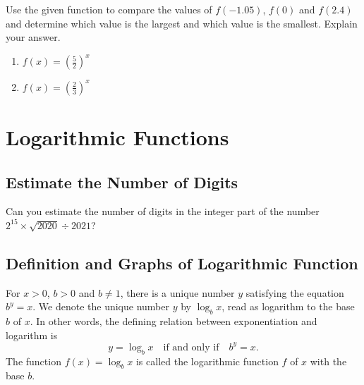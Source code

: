 \documentclass[
  en,11pt]{elegantbook}
\providecommand{\tightlist}{%
  \setlength{\itemsep}{0pt}\setlength{\parskip}{0pt}}
\newcommand{\size}[2]{{\fontsize{#1}{0}\selectfont#2}}
\renewenvironment{exercise}[1][]{
    \refstepcounter{exer}
    \par\noindent
    \makebox[-3pt][r]{\color{red!90}\size{12}{\HandPencilLeft}}
	\textbf{\color{main}{\exercisename} \theexer #1}
    \rmfamily
}{\par\ignorespacesafterend}
\newenvironment{rmdthink}{
	\vspace*{0.5\baselineskip}
	\par\noindent
	\makebox[-4pt][r]{\color{green!90}\size{12}{\faLightbulbO}\,\,}
    \begin{tcolorbox}[
    enhanced,
    title={\textbf{\color{second}Think}},
    title style={left color=blue!10!green!20!white,right color=yellow!20!blue!20!white},
    colback=green!20!white,
    ]
    \sffamily
}{
    \end{tcolorbox}
	\par\ignorespacesafterend
}
\begin{document}
\begin{exercise}

Use the given function to compare the values of \(f(-1.05)\), \(f(0)\) and \(f(2.4)\) and determine which value is the largest and which value is the smallest. Explain your answer.

\begin{enumerate}
\def\labelenumi{\arabic{enumi}.}
\tightlist
\item
  \(f(x)=\left(\frac{5}{2}\right)^x\)
\item
  \(f(x)=\left(\frac23\right)^x\)
\end{enumerate}

\end{exercise}

\hypertarget{logarithmic-functions}{%
\chapter{Logarithmic Functions}\label{logarithmic-functions}}

\hypertarget{estimate-the-number-of-digits}{%
\section{Estimate the Number of Digits}\label{estimate-the-number-of-digits}}

\begin{rmdthink}

Can you estimate the number of digits in the integer part of the number \(2^{15}\times \sqrt{2020}\div 2021\)?

\end{rmdthink}

\hypertarget{definition-and-graphs-of-logarithmic-function}{%
\section{Definition and Graphs of Logarithmic Function}\label{definition-and-graphs-of-logarithmic-function}}

For \(x>0\), \(b>0\) and \(b\neq 1\), there is a unique number \(y\) satisfying the equation \(b^y=x\). We denote the unique number \(y\) by \(\log_bx\), read as logarithm to the base \(b\) of \(x\). In other words, the defining relation between exponentiation and logarithm is
\[
y=\log_bx \quad\text{if and only if} \quad b^y=x.
\]
The function \(f(x)=\log_bx\) is called the logarithmic function \(f\) of \(x\) with the base \(b\).
\end{document}
